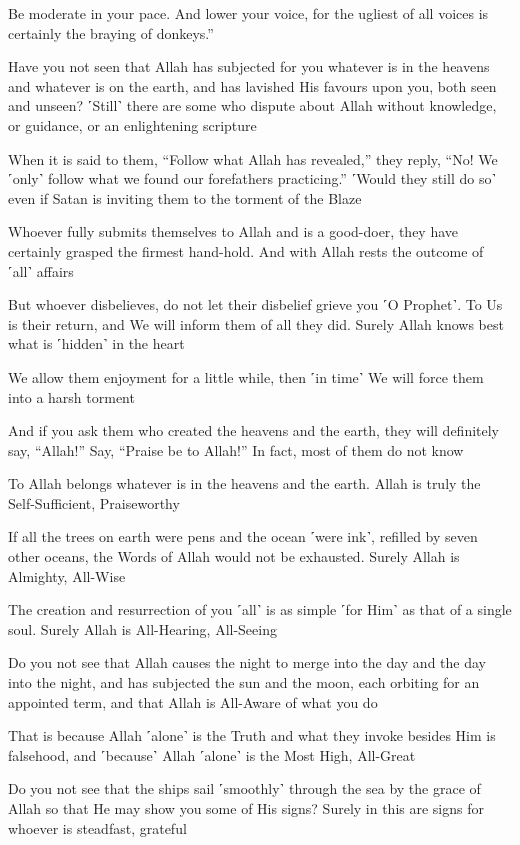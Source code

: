 Be moderate in your pace. And lower your voice, for the ugliest of all voices is certainly the braying of donkeys.”

Have you not seen that Allah has subjected for you whatever is in the heavens and whatever is on the earth, and has lavished His favours upon you, both seen and unseen? ˹Still˺ there are some who dispute about Allah without knowledge, or guidance, or an enlightening scripture

When it is said to them, “Follow what Allah has revealed,” they reply, “No! We ˹only˺ follow what we found our forefathers practicing.” ˹Would they still do so˺ even if Satan is inviting them to the torment of the Blaze

Whoever fully submits themselves to Allah and is a good-doer, they have certainly grasped the firmest hand-hold. And with Allah rests the outcome of ˹all˺ affairs

But whoever disbelieves, do not let their disbelief grieve you ˹O Prophet˺. To Us is their return, and We will inform them of all they did. Surely Allah knows best what is ˹hidden˺ in the heart

We allow them enjoyment for a little while, then ˹in time˺ We will force them into a harsh torment

And if you ask them who created the heavens and the earth, they will definitely say, “Allah!” Say, “Praise be to Allah!” In fact, most of them do not know

To Allah belongs whatever is in the heavens and the earth. Allah is truly the Self-Sufficient, Praiseworthy

If all the trees on earth were pens and the ocean ˹were ink˺, refilled by seven other oceans, the Words of Allah would not be exhausted. Surely Allah is Almighty, All-Wise

The creation and resurrection of you ˹all˺ is as simple ˹for Him˺ as that of a single soul. Surely Allah is All-Hearing, All-Seeing

Do you not see that Allah causes the night to merge into the day and the day into the night, and has subjected the sun and the moon, each orbiting for an appointed term, and that Allah is All-Aware of what you do

That is because Allah ˹alone˺ is the Truth and what they invoke besides Him is falsehood, and ˹because˺ Allah ˹alone˺ is the Most High, All-Great

Do you not see that the ships sail ˹smoothly˺ through the sea by the grace of Allah so that He may show you some of His signs? Surely in this are signs for whoever is steadfast, grateful

